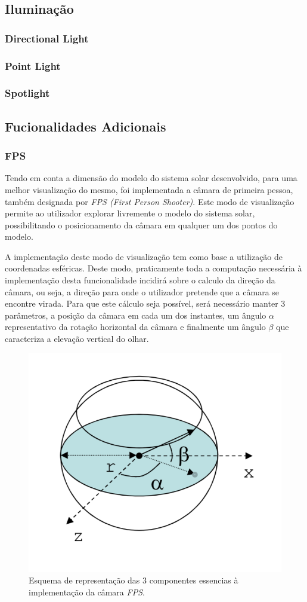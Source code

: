 \documentclass[a4paper]{article}
\begin{document}
\subsection{Iluminação} %

\subsubsection{Directional Light}
\subsubsection{Point Light}
\subsubsection{Spotlight}

\subsection{Fucionalidades Adicionais}

\subsubsection{FPS} %

\hspace{3mm} Tendo em conta a dimensão do modelo do sistema solar desenvolvido, para uma melhor visualização do mesmo, foi implementada a câmara de primeira pessoa, também designada por \textit{FPS (First Person Shooter)}. Este modo de visualização permite ao utilizador explorar livremente o modelo do sistema solar, possibilitando o posicionamento da câmara em qualquer um dos pontos do modelo.

A implementação deste modo de visualização tem como base a utilização de coordenadas esféricas. Deste modo, praticamente toda a computação necessária à implementação desta funcionalidade incidirá sobre o calculo da direção da câmara, ou seja, a direção para onde o utilizador pretende que a câmara se encontre virada. Para que este cálculo seja possível, será necessário manter 3 parâmetros, a posição da câmara em cada um dos instantes, um ângulo $\alpha$ representativo da rotação horizontal da câmara e finalmente um ângulo $\beta$ que caracteriza a elevação vertical do olhar.

\begin{figure}[!h]
    \centering
    \includegraphics[width=0.5\linewidth]{referencial_FPS.png}
    \caption{Esquema de representação das 3 componentes essencias à implementação da câmara \textit{FPS}.}
    \label{fig:ref_FPS}
\end{figure}
\end{document}
